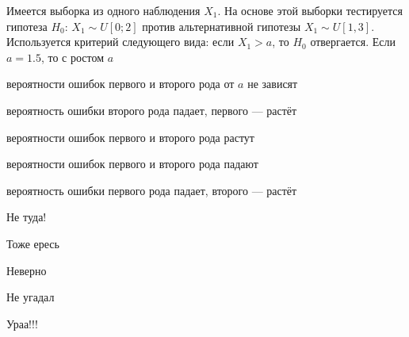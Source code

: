 
\begin{question}
Имеется выборка из одного наблюдения \(X_1\). На основе этой выборки
тестируется гипотеза \(H_0\): \(X_1 \sim U[0;2]\) против альтернативной
гипотезы \(X_1 \sim U[1,3]\). Используется критерий следующего вида:
если \(X_1>a\), то \(H_0\) отвергается. Если \(a=1.5\), то с ростом
\(a\)
\begin{answerlist}
  \item вероятности ошибок первого и второго рода от \(a\) не зависят
  \item вероятность ошибки второго рода падает, первого — растёт
  \item вероятности ошибок первого и второго рода растут
  \item вероятности ошибок первого и второго рода падают
  \item вероятность ошибки первого рода падает, второго — растёт
\end{answerlist}
\end{question}

\begin{solution}
\begin{answerlist}
  \item Не туда!
  \item Тоже ересь
  \item Неверно
  \item Не угадал
  \item Ураа!!!
\end{answerlist}
\end{solution}

